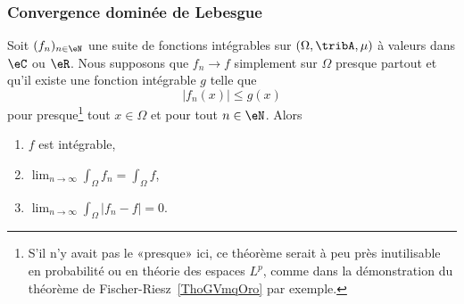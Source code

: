 \subsubsection{Convergence dominée de Lebesgue}

\begin{theorem}        \label{ThoConvDomLebVdhsTf}
    Soit \( (f_n)_{n\in\eN}\) une suite de fonctions intégrables sur \( (\Omega,\tribA,\mu)\) à valeurs dans \( \eC\) ou \( \eR\). Nous supposons que  \( f_n\to f\) simplement sur \( \Omega\) presque partout et qu'il existe une fonction intégrable \( g\) telle que
    \begin{equation}
        | f_n(x) | \leq g(x)
    \end{equation}
    pour presque\footnote{S'il n'y avait pas le «presque» ici, ce théorème serait à peu près inutilisable en probabilité ou en théorie des espaces \( L^p\), comme dans la démonstration du théorème de Fischer-Riesz~\ref{ThoGVmqOro} par exemple.} tout \( x\in\Omega\) et pour tout \( n\in \eN\). Alors
    \begin{enumerate}
        \item
            \( f\) est intégrable,
        \item
           $\lim_{n\to \infty} \int_{\Omega}f_n=\int_\Omega f$,
        \item
            $\lim_{n\to \infty} \int_{\Omega}| f_n-f |=0$.
    \end{enumerate}
\end{theorem}

